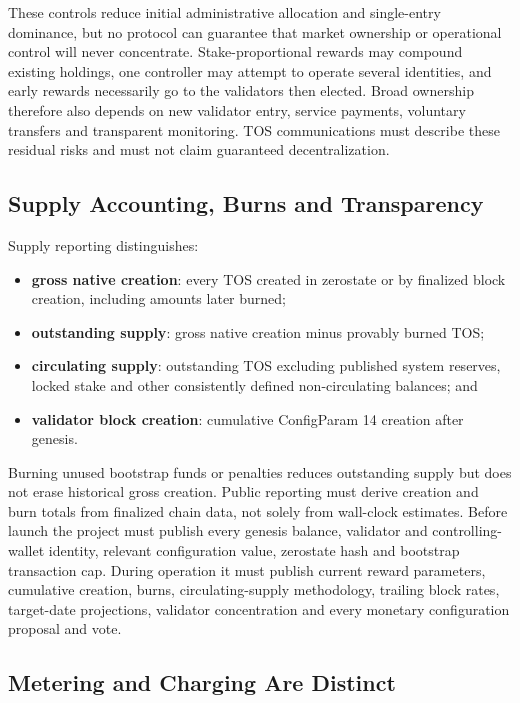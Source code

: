 \documentclass[11pt,oneside]{article}
\begin{document}
These controls reduce initial administrative allocation and single-entry dominance, but no
protocol can guarantee that market ownership or operational control will never concentrate.
Stake-proportional rewards may compound existing holdings, one controller may attempt to
operate several identities, and early rewards necessarily go to the validators then elected.
Broad ownership therefore also depends on new validator entry, service payments, voluntary
transfers and transparent monitoring. TOS communications must describe these residual risks
and must not claim guaranteed decentralization.

\subsection{Supply Accounting, Burns and Transparency}

Supply reporting distinguishes:

\begin{itemize}
  \item \textbf{gross native creation}: every TOS created in zerostate or by finalized block
        creation, including amounts later burned;
  \item \textbf{outstanding supply}: gross native creation minus provably burned TOS;
  \item \textbf{circulating supply}: outstanding TOS excluding published system reserves,
        locked stake and other consistently defined non-circulating balances; and
  \item \textbf{validator block creation}: cumulative ConfigParam 14 creation after genesis.
\end{itemize}

Burning unused bootstrap funds or penalties reduces outstanding supply but does not erase
historical gross creation. Public reporting must derive creation and burn totals from
finalized chain data, not solely from wall-clock estimates. Before launch the project must
publish every genesis balance, validator and controlling-wallet identity, relevant
configuration value, zerostate hash and bootstrap transaction cap. During operation it must
publish current reward parameters, cumulative creation, burns, circulating-supply
methodology, trailing block rates, target-date projections, validator concentration and
every monetary configuration proposal and vote.

\subsection{Metering and Charging Are Distinct}
\end{document}
